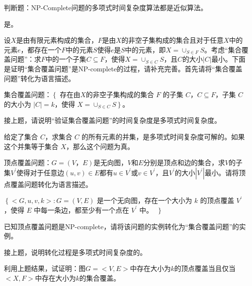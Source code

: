 \begin{problem}
	判断题：NP-Complete问题的多项式时间复杂度算法都是近似算法。
\end{problem}
\begin{solution}
	是。
\end{solution}


\begin{problem}
	设$X$是由有限元素构成的集合，$F$是由$X$的非空子集构成的集合且对于任意$X$中的元素$e$，都存在一个$F$中的元素$S$使得$e$是$S$中的元素，即$X=\cup_{S\in F}S$。考虑“集合覆盖问题”：求$F$中的一个子集$C\subseteq F$，使得$X=\cup_{S\in C}S$，且$C$的大小$|C|$最小。下面是证明“集合覆盖问题”是NP-complete的过程，请补充完善。首先请将“集合覆盖问题”转化为语言描述。
\end{problem}
\begin{solution}
	集合覆盖问题：$\left\{\right.$ 存在由$X$的非空子集构成的集合 $F$ 的子集 $C$，$C \subseteq F$，子集 $C$ 的大小为 $|C|=k$，使得 $X=\cup_{S \in C} S$$\left.\right\}$。
\end{solution}


\begin{problem}
	接上题，请说明“验证集合覆盖问题”的时间复杂度是多项式时间复杂度。
\end{problem}
\begin{solution}
	给定了集合 $C$，求集合 $C$ 的所有元素的并集，是多项式时间复杂度可解的。如果这个并集等于集合 $X$，那么这个问题为真。
\end{solution}


\begin{problem}
	顶点覆盖问题：$G=(V，E)$是无向图，$V$和$E$分别是顶点和边的集合，求$V$的子集$V^\prime$使得对于任意边$(u,v)\in E$都有$u\in V^\prime$或$v\in V^\prime$，且$V^\prime$的大小$|V^\prime|$最小。请将顶点覆盖问题转化为语言描述。
\end{problem}
\begin{solution}
	$\left\{<G, u, v, k>\right. : G = (V, E)$ 是一个无向图，存在一个大小为 $k$ 的顶点覆盖 $V^\prime$，使得 $E$ 中每一条边，都至少有一个点在 $V^\prime$ 中。 $\
	\left.\right\}$
\end{solution}


\begin{problem}
	已知顶点覆盖问题是NP-complete，请将该问题的实例转化为“集合覆盖问题”的实例。
\end{problem}
\begin{solution}

\end{solution}


\begin{problem}
	接上题，说明转化过程是多项式时间复杂度的。
\end{problem}
\begin{solution}

\end{solution}


\begin{problem}
	利用上题结果，试证明：图$G=<V,E>$中存在大小为$k$的顶点覆盖当且仅当$<X,F>$中存在大小为$k$的集合覆盖。
\end{problem}
\begin{solution}

\end{solution}



